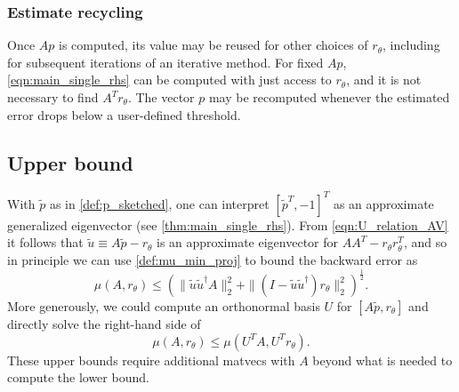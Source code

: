 \documentclass{article}
\newcommand{\ts}{^T}
\begin{document}
\subsubsection{Estimate recycling}\label{sec:recycled_bound}
Once $Ap$ is computed, its value may be reused for other choices of $r_\theta$, including for subsequent iterations of an iterative method. For fixed $Ap$, \cref{eqn:main_single_rhs} can be computed with just access to $r_\theta$, and it is not necessary to find $A\ts r_\theta$. The vector $p$ may be recomputed whenever the estimated error drops below a user-defined threshold. 

\subsection{Upper bound}
With $\widetilde{p}$ as in \cref{def:p_sketched}, one can interpret $[\widetilde{p}\ts, -1]\ts$ as an approximate generalized eigenvector (see \cref{thm:main_single_rhs}). From \cref{eqn:U_relation_AV} it follows that $\widetilde{u}\equiv A\widetilde{p}-r_\theta$ is an approximate eigenvector for $AA\ts - r_\theta r_\theta\ts$, and so in principle we can use \cref{def:mu_min_proj} to bound the backward error as
\begin{equation*}
    \mu(A,r_\theta) \leq \left(\|\widetilde{u}\widetilde{u}^\dagger A\|_2^2 + \|(I - \widetilde{u}\widetilde{u}^\dagger)r_\theta\|_2^2\right)^{\frac{1}{2}}.
\end{equation*}
More generously, we could compute an orthonormal basis $U$ for $[A\widetilde{p}, r_\theta]$ and directly solve the right-hand side of
\begin{equation}\label{eqn:upper_bound_generous}
    \mu(A,r_\theta) \leq \mu(U\ts A, U\ts r_\theta).
\end{equation}
These upper bounds require additional matvecs with $A$ beyond what is needed to compute the lower bound.


\end{document}
